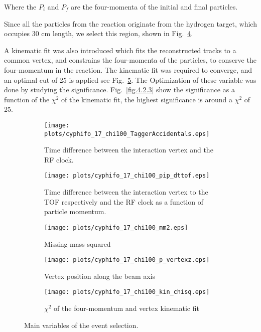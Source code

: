 Where the $P_i$ and $P_f$ are the four-momenta of the initial and final particles.
\par Since all the particles from the reaction originate from the hydrogen target, which occupies 30 cm length, we select this region, shown in Fig.~\ref{fig.4.2.1.d}.
\par A kinematic fit was also introduced which fits the reconstructed tracks to a common vertex, and constrains the four-momenta of the particles, to conserve the four-momentum in the reaction. The kinematic fit was required to converge, and an optimal cut of 25 is applied see Fig.~\ref{fig.4.2.1.e}. The Optimization of these variable was done by studying the significance. Fig.~\ref{fig.4.2.3} show the significance as a function of the $\chi^2$ of the kinematic fit, the highest significance is around a $\chi^2$ of 25.

\begin{figure}[H]
    \centering
    \begin{subfigure}[b]{0.45\textwidth}
        \texttt{[image: plots/cyphifo\_17\_chi100\_TaggerAccidentals.eps]}
        \caption{Time difference between the interaction vertex and the RF clock.}
        \label{fig.4.2.1.a}
    \end{subfigure}\hfill
    \begin{subfigure}[b]{0.45\textwidth}
        \texttt{[image: plots/cyphifo\_17\_chi100\_pip\_dttof.eps]}
        \caption{Time difference between the interaction vertex to the TOF respectively and the RF clock as a function of particle momentum.}
        \label{fig.4.2.1.b}
    \end{subfigure}\hfill
    \begin{subfigure}[b]{0.45\textwidth}
        \texttt{[image: plots/cyphifo\_17\_chi100\_mm2.eps]}
        \caption{Missing mass squared}
        \label{fig.4.2.1.c}
    \end{subfigure}\hfill
    \begin{subfigure}[b]{0.45\textwidth}
        \texttt{[image: plots/cyphifo\_17\_chi100\_p\_vertexz.eps]}
        \caption{Vertex position along the beam axis}
        \label{fig.4.2.1.d}
    \end{subfigure}\hfill
    \begin{subfigure}[b]{0.45\textwidth}
        \texttt{[image: plots/cyphifo\_17\_chi100\_kin\_chisq.eps]}
        \caption{$\chi^{2}$ of the four-momentum and vertex kinematic fit}
        \label{fig.4.2.1.e}
    \end{subfigure}
    \caption{Main variables of the event selection.}
    \label{fig.4.2.1}
\end{figure}

